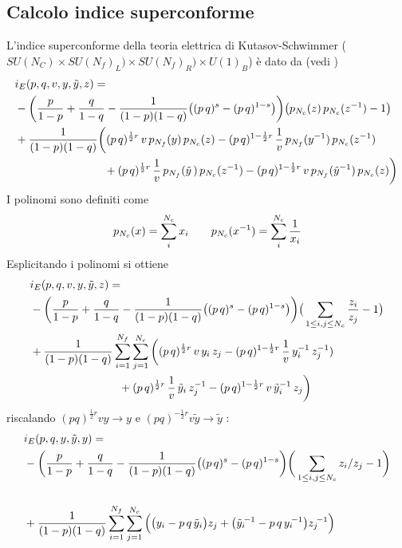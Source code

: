 \documentclass[a4paper,12pt]{article}
\begin{document}
\subsection{Calcolo indice superconforme}
 L'indice superconforme della teoria elettrica di Kutasov-Schwimmer ( $ SU(N_C)  \times SU(N_f)_L)\times SU(N_f)_R)\times  U(1)_B  $) è dato da (vedi \citep{Dolan:2008qi})
\begin{equation}
\begin{aligned}
& i_E (p,q,v, y,\tilde y ,z) = \\ & -\bigg({p \over 1-p}+{q \over 1-q} -{1 \over (1-p)(1-q)}
\big((p\,q)^{s}- (p\,q)^{1-s}\big)
\bigg) \big( p_{N_c}( z)\, p_{N_c}(z^{-1})-1\big ) \\
&{} +{1\over (1-p)(1-q)}\bigg((p\,q)^{{1\over 2}r} \, v \, p_{N_f}(y)\, p_{N_c}(z)
- (p\,q)^{1- {1\over 2}r} \, {1 \over v}\, p_{{N_f}}(y^{-1})\, p_{{N_c}}(z^{-1})\\
&\qquad\qquad\qquad\qquad
+ (p\,q)^{{1\over 2}r}\, {1\over v}\, p_{{N_f}}({\tilde y}\,) \, p_{{N_c}}(z^{-1})
- (p\,q)^{1- {1\over 2}r} \, v\, p_{N_f}({\tilde y}^{-1})\, p_{N_c}(z)\bigg) \,\\
\end{aligned}
\end{equation}
I polinomi sono definiti come
$$
 p_{N_c}({x}) = \sum_i^{N_c} x_i \qquad p_{N_c}({x^{-1}}) =  \sum_i^{N_c} { 1 \over x_i  }
$$
Esplicitando i polinomi si ottiene
\begin{align*}
& i_E (p,q,v, y,\tilde y ,z) = \\ & -\bigg({p \over 1-p}+{q \over 1-q} -{1 \over (1-p)(1-q)}
\big((p\,q)^{s}- (p\,q)^{1-s}\big)
\bigg) \big(\sum_{1 \leq i,j \leq N_c} {z_i \over z_j} -1\big ) \\
&{} +{1\over (1-p)(1-q)}\sum_{i = 1}^{N_f} \sum_{j = 1}^{N_c}\bigg( (p\,q)^{{1\over 2}r} \, v \, y_i \, z_j
- (p\,q)^{1- {1\over 2}r} \, {1 \over v}\,y_i^{-1} \, z_j^{-1})\\
&\qquad\qquad\qquad\qquad
+ (p\,q)^{{1\over 2}r}\, {1\over v}\, \tilde y_i \, z_j^{-1}
- (p\,q)^{1- {1\over 2}r} \, v\, \tilde y_i^{-1}\, z_j\bigg) \,\\
\end{align*}
riscalando $ (pq)^{ \frac{1}{2} r }v y \rightarrow y$ e
$ (pq)^{- \frac{1}{2} r } v \tilde y \rightarrow \tilde y$  :
\begin{equation}
\begin{aligned}
&i_E(p,q,y,{\tilde y},y) =\\
&{} -\bigg({p\over 1-p}+{q\over 1-q } -{1 \over (1-p)(1-q)}
\big((p\,q)^{s}- (p\,q)^{1-s}\bigg)
\bigg(\sum_{1\leq i,j\leq N_c}z_i/z_j-1\bigg)\cr\\
&{}+{1\over
(1-p)(1-q)}\sum_{i=1}^{N_f}\sum_{j=1}^{N_c}\Big(\big (y_i-p\,q\,{\tilde y}_i \big )z_j
+ \big ({\tilde y}_i{\!}^{-1}-p\,q\,y_i{\!}^{-1} \big )z_j{\!}^{-1}\Big)\,
\end{aligned}
\end{equation}
\end{document}
